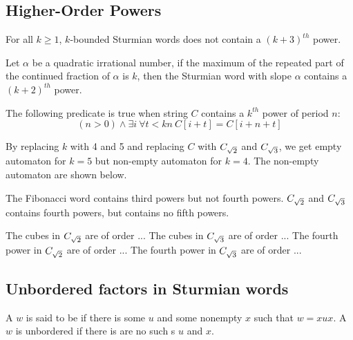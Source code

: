 \subsection{Higher-Order Powers}

\begin{conjecture}
    For all $k\ge 1$, $k$-bounded Sturmian words does not contain a $(k+3)^{th}$ power. 
\end{conjecture}

\begin{conjecture}
    Let $\alpha$ be a quadratic irrational number, if the maximum of the repeated part of the continued fraction of $\alpha$ is $k$, then the Sturmian word with slope $\alpha$ contains a $(k+2)^{th}$ power.
\end{conjecture}

The following predicate is true when string $C$ contains a $k^{th}$ power of period $n$:
\[(n > 0) \wedge \exists i ~ \forall t < kn ~ C[i+t]=C[i+n+t]\]

By replacing $k$ with 4 and 5 and replacing $C$ with $C_{\sqrt{2}}$ and $C_{\sqrt{3}}$, we get empty automaton for $k=5$ but non-empty automaton for $k=4$. The non-empty automaton are shown below.



\begin{example}
The Fibonacci word contains third powers but not fourth powers. $C_{\sqrt{2}}$ and $C_{\sqrt{3}}$ contains fourth powers, but contains no fifth powers.
\end{example}

\begin{example}
The cubes in $C_{\sqrt{2}}$ are of order ...
The cubes in $C_{\sqrt{3}}$ are of order ...
The fourth power in $C_{\sqrt{2}}$ are of order ...
The fourth power in $C_{\sqrt{3}}$ are of order ...
\end{example}

\subsection{Unbordered factors in Sturmian words}\label{sec:unbordered}

A \word $w$ is said to be  if there is some \word $u$ and some nonempty \word $x$ such that $w = xux$.
A \word $w$ is unbordered if there is are no such \word{}s $u$ and $x$.

